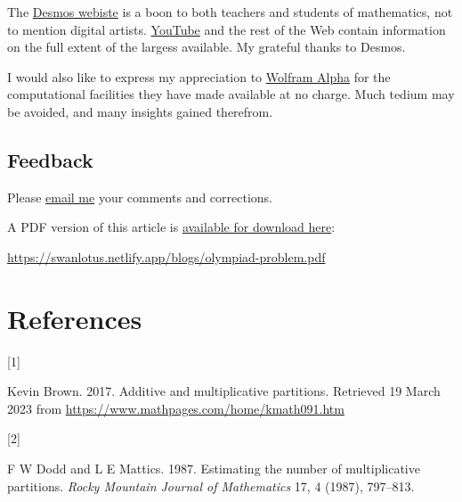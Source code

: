 \documentclass[
  a4paper,
]{article}
\newlength{\cslhangindent}
\newlength{\csllabelwidth}
\newenvironment{CSLReferences}[2] %
 {\begin{list}{}{%
  \setlength{\itemindent}{0pt}
  \setlength{\leftmargin}{0pt}
  \setlength{\parsep}{0pt}
  \ifodd #1
   \setlength{\leftmargin}{\cslhangindent}
   \setlength{\itemindent}{-1\cslhangindent}
  \fi
  \setlength{\itemsep}{#2\baselineskip}}}
 {\end{list}}
\newcommand{\CSLLeftMargin}[1]{\parbox[t]{\csllabelwidth}{\strut#1\strut}}
\newcommand{\CSLRightInline}[1]{\parbox[t]{\linewidth - \csllabelwidth}{\strut#1\strut}}
\begin{document}
The \href{https://www.desmos.com/}{Desmos webiste} is a boon to both
teachers and students of mathematics, not to mention digital artists.
\href{desmos}{YouTube} and the rest of the Web contain information on
the full extent of the largess available. My grateful thanks to Desmos.

I would also like to express my appreciation to
\href{https://www.wolframalpha.com/}{Wolfram Alpha} for the
computational facilities they have made available at no charge. Much
tedium may be avoided, and many insights gained therefrom.

\subsection{Feedback}\label{feedback}

Please \href{mailto:feedback.swanlotus@gmail.com}{email me} your
comments and corrections.

\noindent A PDF version of this article is
\href{./olympiad-problem.pdf}{available for download here}:

\begin{small}

\begin{sffamily}

\url{https://swanlotus.netlify.app/blogs/olympiad-problem.pdf}

\end{sffamily}

\end{small}

\section*{References}\label{bibliography}

\label{refs}
\begin{CSLReferences}{0}{0}
\CSLLeftMargin{{[}1{]} }%
\CSLRightInline{Kevin Brown. 2017. Additive and multiplicative
partitions. Retrieved 19 March 2023 from
\url{https://www.mathpages.com/home/kmath091.htm}}

\CSLLeftMargin{{[}2{]} }%
\CSLRightInline{F W Dodd and L E Mattics. 1987. Estimating the number of
multiplicative partitions. \emph{Rocky Mountain Journal of Mathematics}
17, 4 (1987), 797--813.}

\end{CSLReferences}
\end{document}

